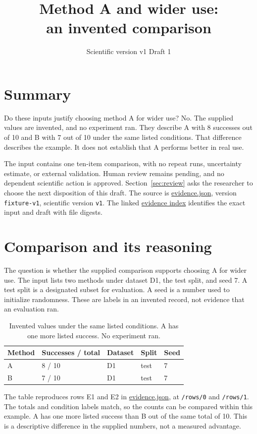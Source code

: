 \documentclass[lang=en,bibend=bibtex,a4paper,11pt]{elegantpaper}
\title{Method A and wider use:\\an invented comparison}
\author{}
\date{Scientific version v1 \quad Draft 1}
\begin{document}
\maketitle

\section{Summary}
\label{sec:summary}
Do these inputs justify choosing method A for wider use?
No. The supplied values are invented, and no experiment ran.
They describe A with 8 successes out of 10 and B with 7 out of 10 under the same listed conditions.
That difference describes the example. It does not establish that A performs better in real use.

The input contains one ten-item comparison, with no repeat runs, uncertainty estimate, or external validation.
Human review remains pending, and no dependent scientific action is approved.
Section~\ref{sec:review} asks the researcher to choose the next disposition of this draft.
The source is \href{run:evidence.json}{evidence.json}, version \texttt{fixture-v1}, scientific version \texttt{v1}.
The linked \href{run:evidence-index.json}{evidence index} identifies the exact input and draft with file digests.

\section{Comparison and its reasoning}
\label{sec:comparison}
The question is whether the supplied comparison supports choosing A for wider use.
The input lists two methods under dataset D1, the test split, and seed 7.
A test split is a designated subset for evaluation.
A seed is a number used to initialize randomness.
These are labels in an invented record, not evidence that an evaluation ran.

\begin{table}[htbp]
\centering
\begin{tabular}{lllll}
\toprule
Method & Successes / total & Dataset & Split & Seed \\
\midrule
A & 8 / 10 & D1 & test & 7 \\
B & 7 / 10 & D1 & test & 7 \\
\bottomrule
\end{tabular}
\caption{Invented values under the same listed conditions. A has one more listed success. No experiment ran.}
\label{tab:comparison}
\end{table}

The table reproduces rows E1 and E2 in \href{run:evidence.json}{evidence.json}, at \texttt{/rows/0} and \texttt{/rows/1}.
The totals and condition labels match, so the counts can be compared within this example.
A has one more listed success than B out of the same total of 10.
This is a descriptive difference in the supplied numbers, not a measured advantage.
\end{document}
